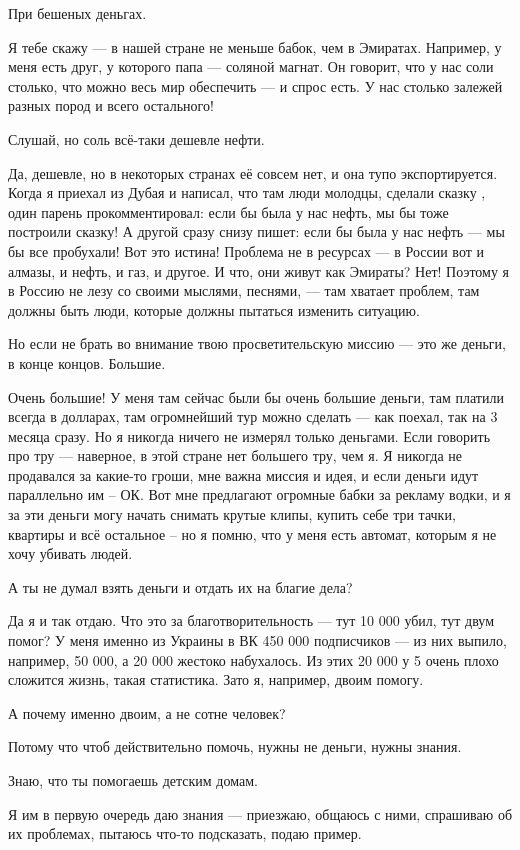 При бешеных деньгах.

Я тебе скажу --- в нашей стране не меньше бабок, чем в Эмиратах. Например, у меня
есть друг, у которого папа --- соляной магнат. Он говорит, что у нас соли
столько, что можно весь мир обеспечить --- и спрос есть. У нас столько залежей
разных пород и всего остального!

Слушай, но соль всё-таки дешевле нефти.

Да, дешевле, но в некоторых странах её совсем нет, и она тупо экспортируется.
Когда я приехал из Дубая и написал, что там люди молодцы, сделали сказку , один
парень прокомментировал: если бы была у нас нефть, мы бы тоже построили сказку!
А другой сразу снизу пишет: если бы была у нас нефть --- мы бы все пробухали! Вот
это истина! Проблема не в ресурсах --- в России вот и алмазы, и нефть, и газ, и
другое. И что, они живут как Эмираты? Нет! Поэтому я в Россию не лезу со своими
мыслями, песнями, --- там хватает проблем, там должны быть люди, которые должны
пытаться изменить ситуацию.

Но если не брать во внимание твою просветительскую миссию --- это же деньги, в
конце концов. Большие.

Очень большие! У меня там сейчас были бы очень большие деньги, там платили
всегда в долларах, там огромнейший тур можно сделать --- как поехал, так на 3
месяца сразу. Но я никогда ничего не измерял только деньгами. Если говорить про
тру --- наверное, в этой стране нет большего тру, чем я. Я никогда не продавался
за какие-то гроши, мне важна миссия и идея, и если деньги идут параллельно им –
ОК. Вот мне предлагают огромные бабки за рекламу водки, и я за эти деньги могу
начать снимать крутые клипы, купить себе три тачки, квартиры и всё остальное –
но я помню, что у меня есть автомат, которым я не хочу убивать людей.

А ты не думал взять деньги и отдать их на благие дела?

Да я и так отдаю. Что это за благотворительность --- тут 10 000 убил, тут двум
помог? У меня именно из Украины в ВК 450 000 подписчиков --- из них выпило,
например, 50 000, а 20 000 жестоко набухалось. Из этих 20 000 у 5 очень плохо
сложится жизнь, такая статистика. Зато я, например, двоим помогу.

А почему именно двоим, а не сотне человек?

Потому что чтоб действительно помочь, нужны не деньги, нужны знания.

Знаю, что ты помогаешь детским домам.

Я им в первую очередь даю знания --- приезжаю, общаюсь с ними, спрашиваю об их
проблемах, пытаюсь что-то подсказать, подаю пример.

